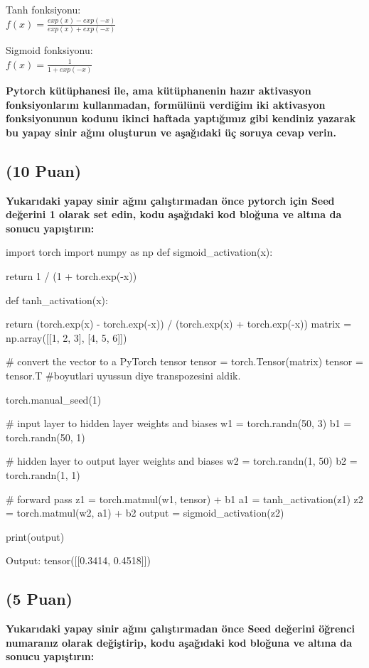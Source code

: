 \documentclass[11pt]{article}
\begin{document}
Tanh fonksiyonu:\\
$f(x) = \frac{exp(x) - exp(-x)}{exp(x) + exp(-x)}$
\vspace{.2in}

Sigmoid fonksiyonu:\\
$f(x) = \frac{1}{1 + exp(-x)}$

\vspace{.2in}
 \textbf{Pytorch kütüphanesi ile, ama kütüphanenin hazır aktivasyon fonksiyonlarını kullanmadan, formülünü verdiğim iki aktivasyon fonksiyonunun kodunu ikinci haftada yaptığımız gibi kendiniz yazarak bu yapay sinir ağını oluşturun ve aşağıdaki üç soruya cevap verin.}
 
\subsection{(10 Puan)} \textbf{Yukarıdaki yapay sinir ağını çalıştırmadan önce pytorch için Seed değerini 1 olarak set edin, kodu aşağıdaki kod bloğuna ve altına da sonucu yapıştırın:}

\begin{python}
import torch
import numpy as np
def sigmoid_activation(x):

  return 1 / (1 + torch.exp(-x))

def tanh_activation(x):
  
  return (torch.exp(x) - torch.exp(-x)) / (torch.exp(x) + torch.exp(-x))
matrix = np.array([[1, 2, 3], [4, 5, 6]])

# convert the vector to a PyTorch tensor
tensor = torch.Tensor(matrix)
tensor = tensor.T    #boyutlari uyussun diye transpozesini aldik.

torch.manual_seed(1) 

# input layer to hidden layer weights and biases
w1 = torch.randn(50, 3)
b1 = torch.randn(50, 1)

# hidden layer to output layer weights and biases
w2 = torch.randn(1, 50)
b2 = torch.randn(1, 1)

# forward pass
z1 = torch.matmul(w1, tensor) + b1  
a1 = tanh_activation(z1)
z2 = torch.matmul(w2, a1) + b2
output = sigmoid_activation(z2)

print(output)
\end{python}

Output: tensor([[0.3414, 0.4518]])

\subsection{(5 Puan)} \textbf{Yukarıdaki yapay sinir ağını çalıştırmadan önce Seed değerini öğrenci numaranız olarak değiştirip, kodu aşağıdaki kod bloğuna ve altına da sonucu yapıştırın:}
\end{document}
